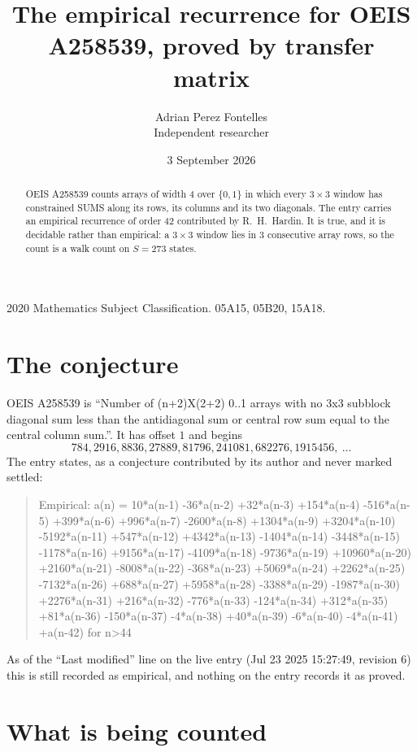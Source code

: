 \documentclass[11pt,a4paper]{article}
\title{The empirical recurrence for OEIS A258539, proved by transfer matrix}
\author{Adrian Perez Fontelles\\ \small Independent researcher}
\date{3 September 2026}
\theoremstyle{plain}
\theoremstyle{definition}
\begin{document}
\maketitle

\begin{abstract}
OEIS A258539 counts arrays of width $4$ over $\{0,1\}$ in which every $3\times3$ window has
constrained SUMS along its rows, its columns and its two diagonals. The entry carries an
empirical recurrence of order $42$ contributed by R.~H.~Hardin. It is true, and it is
decidable rather than empirical: a $3\times3$ window lies in $3$ consecutive array rows,
so the count is a walk count on $S=273$ states.
\end{abstract}

\noindent\small 2020 Mathematics Subject Classification. 05A15, 05B20, 15A18.\normalsize

\section{The conjecture}

OEIS A258539 is ``Number of (n+2)X(2+2) 0..1 arrays with no 3x3 subblock diagonal sum less than the antidiagonal sum or central row sum equal to the central column sum.''. It has offset $1$ and begins
\[
784, 2916, 8836, 27889, 81796, 241081, 682276, 1915456,\ \dots
\]
The entry states, as a conjecture contributed by its author and never marked settled:
\begin{quote}
Empirical: a(n) = 10*a(n-1) -36*a(n-2) +32*a(n-3) +154*a(n-4) -516*a(n-5) +399*a(n-6) +996*a(n-7) -2600*a(n-8) +1304*a(n-9) +3204*a(n-10) -5192*a(n-11) +547*a(n-12) +4342*a(n-13) -1404*a(n-14) -3448*a(n-15) -1178*a(n-16) +9156*a(n-17) -4109*a(n-18) -9736*a(n-19) +10960*a(n-20) +2160*a(n-21) -8008*a(n-22) -368*a(n-23) +5069*a(n-24) +2262*a(n-25) -7132*a(n-26) +688*a(n-27) +5958*a(n-28) -3388*a(n-29) -1987*a(n-30) +2276*a(n-31) +216*a(n-32) -776*a(n-33) -124*a(n-34) +312*a(n-35) +81*a(n-36) -150*a(n-37) -4*a(n-38) +40*a(n-39) -6*a(n-40) -4*a(n-41) +a(n-42) for n>44
\end{quote}
As of the ``Last modified'' line on the live entry (Jul 23 2025 15:27:49, revision 6) this is still
recorded as empirical, and nothing on the entry records it as proved.

\section{What is being counted}
\end{document}
